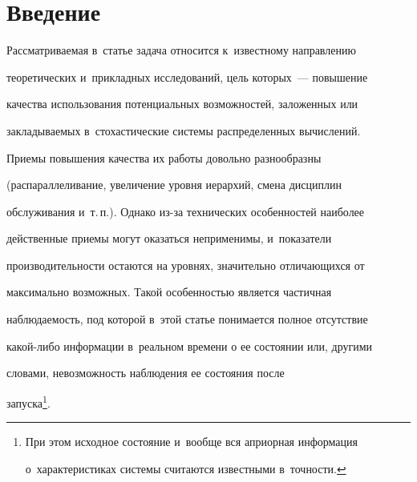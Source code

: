









 \thispagestyle{headings}


 


 \vspace*{-16pt}





\section{Введение}





\vspace*{-2pt}





  Рассматриваемая в~статье задача относится к~известному направлению 


теоретических и~прикладных исследований, цель которых~--- повышение 


качества использования потенциальных возможностей, заложенных или 


закладываемых в~стохастические системы распределенных вычислений. 


Приемы повышения качества их работы довольно разнообразны 


(распараллеливание, увеличение уровня иерархий, смена дисциплин 


обслуживания и~т.\,п.). Однако из-за технических особенностей наиболее 


действенные приемы могут оказаться неприменимы, и~показатели 


производительности остаются на уровнях, значительно от\-ли\-ча\-ющих\-ся от 


максимально возможных. Такой особенностью является частичная 


наблюдаемость, под которой в~этой статье понимается полное отсутствие 


ка\-кой-ли\-бо информации в~реальном времени о ее состоянии или, другими 


словами, невозможность наблюдения ее состояния после 


запуска\footnote{При этом исходное состояние и~вообще вся априорная информация 


о~характеристиках системы считаются известными в~точности.}. 


